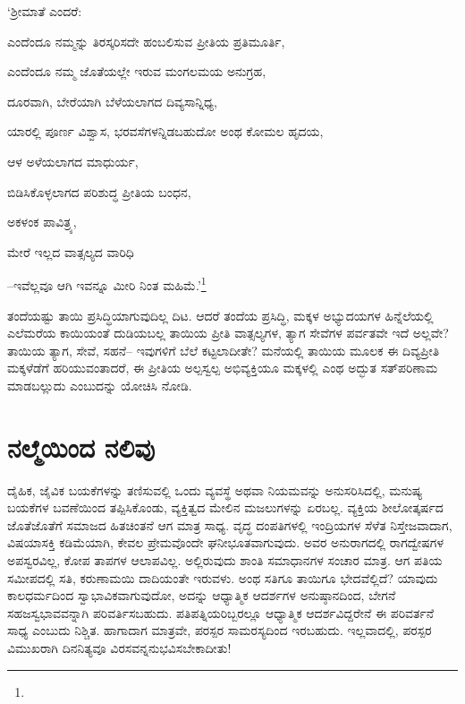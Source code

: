 ‘ಶ‍್ರೀಮಾತೆ ಎಂದರೆ:

ಎಂದೆಂದೂ ನಮ್ಮನ್ನು ತಿರಸ್ಕರಿಸದೇ ಹಂಬಲಿಸುವ ಪ್ರೀತಿಯ ಪ್ರತಿಮೂರ್ತಿ,

ಎಂದೆಂದೂ ನಮ್ಮ ಜೊತೆಯಲ್ಲೇ ಇರುವ ಮಂಗಲಮಯ ಅನುಗ್ರಹ,

ದೂರವಾಗಿ, ಬೇರೆಯಾಗಿ ಬೆಳೆಯಲಾಗದ ದಿವ್ಯಸಾನ್ನಿಧ್ಯ,

ಯಾರಲ್ಲಿ ಪೂರ್ಣ ವಿಶ್ವಾಸ, ಭರವಸೆಗಳನ್ನಿಡಬಹುದೋ ಅಂಥ ಕೋಮಲ ಹೃದಯ,

ಆಳ ಅಳೆಯಲಾಗದ ಮಾಧುರ್ಯ,

ಬಿಡಿಸಿಕೊಳ್ಳಲಾಗದ ಪರಿಶುದ್ಧ ಪ್ರೀತಿಯ ಬಂಧನ,

ಅಕಳಂಕ ಪಾವಿತ್ರ್ಯ,

ಮೇರೆ ಇಲ್ಲದ ವಾತ್ಸಲ್ಯದ ವಾರಿಧಿ

–ಇವೆಲ್ಲವೂ ಆಗಿ ಇವನ್ನೂ ಮೀರಿ ನಿಂತ ಮಹಿಮೆ.’\footnote{\hfill{}}

ತಂದೆಯಷ್ಟು ತಾಯಿ ಪ್ರಸಿದ್ಧಿಯಾಗುವುದಿಲ್ಲ ದಿಟ. ಆದರೆ ತಂದೆಯ ಪ್ರಸಿದ್ಧಿ, ಮಕ್ಕಳ ಅಭ್ಯುದಯಗಳ ಹಿನ್ನೆಲೆಯಲ್ಲಿ ಎಲೆಮರೆಯ ಕಾಯಿಯಂತೆ ದುಡಿಯಬಲ್ಲ ತಾಯಿಯ ಪ್ರೀತಿ ವಾತ್ಸಲ್ಯಗಳ, ತ್ಯಾಗ ಸೇವೆಗಳ ಪರ್ವತವೇ ಇದೆ ಅಲ್ಲವೇ? ತಾಯಿಯ ತ್ಯಾಗ, ಸೇವೆ, ಸಹನೆ– ಇವುಗಳಿಗೆ ಬೆಲೆ ಕಟ್ಟಲಾದೀತೇ? ಮನೆಯಲ್ಲಿ ತಾಯಿಯ ಮೂಲಕ ಈ ದಿವ್ಯಪ್ರೀತಿ ಮಕ್ಕಳೆಡೆಗೆ ಹರಿಯುವಂತಾದರೆ, ಈ ಪ್ರೀತಿಯ ಅಲ್ಪಸ್ವಲ್ಪ ಅಭಿವ್ಯಕ್ತಿಯೂ ಮಕ್ಕಳಲ್ಲಿ ಎಂಥ ಅದ್ಭುತ ಸತ್​\-ಪರಿಣಾಮ ಮಾಡಬಲ್ಲುದು ಎಂಬುದನ್ನು ಯೋಚಿಸಿ ನೋಡಿ.


\section*{ನಲ್ಮೆಯಿಂದ ನಲಿವು}


ದೈಹಿಕ, ಜೈವಿಕ ಬಯಕೆಗಳನ್ನು ತಣಿಸುವಲ್ಲಿ ಒಂದು ವ್ಯವಸ್ಥೆ ಅಥವಾ ನಿಯಮವನ್ನು ಅನುಸರಿಸಿದಲ್ಲಿ, ಮನುಷ್ಯ ಬಯಕೆಗಳ ಬವಣೆಯಿಂದ ತಪ್ಪಿಸಿಕೊಂಡು, ವ್ಯಕ್ತಿತ್ವದ ಮೇಲಿನ ಮಜಲುಗಳನ್ನು ಏರಬಲ್ಲ. ವ್ಯಕ್ತಿಯ ಶೀಲೋತ್ಕರ್ಷದ ಜೊತೆಜೊತೆಗೆ ಸಮಾಜದ ಹಿತಚಿಂತನೆ ಆಗ ಮಾತ್ರ ಸಾಧ್ಯ. ವೃದ್ಧ ದಂಪತಿಗಳಲ್ಲಿ ಇಂದ್ರಿಯಗಳ ಸೆಳೆತ ನಿಸ್ತೇಜವಾದಾಗ, ವಿಷಯಾಸಕ್ತಿ ಕಡಿಮೆಯಾಗಿ, ಕೇವಲ ಪ್ರೇಮವೊಂದೇ ಘನೀಭೂತವಾಗುವುದು. ಅವರ ಅನುರಾಗದಲ್ಲಿ ರಾಗದ್ವೇಷಗಳ ಅಪಸ್ವರವಿಲ್ಲ, ಕೋಪ ತಾಪಗಳ ಆಲಾಪವಿಲ್ಲ. ಅಲ್ಲಿರುವುದು ಶಾಂತಿ ಸಮಾಧಾನಗಳ ಸಂಚಾರ ಮಾತ್ರ. ಆಗ ಪತಿಯ ಸಮೀಪದಲ್ಲಿ ಸತಿ, ಕರುಣಾಮಯಿ ದಾದಿಯಂತೇ ಇರುವಳು. ಅಂಥ ಸತಿಗೂ ತಾಯಿಗೂ ಭೇದವೆಲ್ಲಿದೆ? ಯಾವುದು ಕಾಲಧರ್ಮದಿಂದ ಸ್ವಾಭಾವಿಕವಾಗುವುದೋ, ಅದನ್ನು ಆಧ್ಯಾತ್ಮಿಕ ಆದರ್ಶಗಳ ಅನುಷ್ಠಾನದಿಂದ, ಬೇಗನೆ ಸಹಜಸ್ವಭಾವವನ್ನಾಗಿ ಪರಿವರ್ತಿಸಬಹುದು. ಪತಿಪತ್ನಿಯರಿಬ್ಬರಲ್ಲೂ ಆಧ್ಯಾತ್ಮಿಕ ಆದರ್ಶವಿದ್ದರೇನೆ ಈ ಪರಿವರ್ತನೆ ಸಾಧ್ಯ ಎಂಬುದು ನಿಶ್ಚಿತ. ಹಾಗಾದಾಗ ಮಾತ್ರವೇ, ಪರಸ್ಪರ ಸಾಮರಸ್ಯದಿಂದ ಇರಬಹುದು. ಇಲ್ಲವಾದಲ್ಲಿ, ಪರಸ್ಪರ ವಿಮುಖರಾಗಿ ದಿನನಿತ್ಯವೂ ವಿರಸವನ್ನನುಭವಿಸಬೇಕಾದೀತು!

